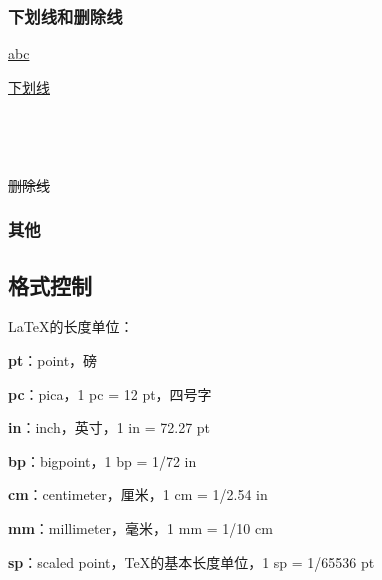 \documentclass{ctexart}
\begin{document}
	    \subsubsection{下划线和删除线}
            \underline{abc} 
		
            \uline{下划线}\\
            \\
            \\
            \\
            \\
            \sout{删除线}\\

        \subsubsection{其他}
    
    \subsection{格式控制}
            \LaTeX 的长度单位：

            \textbf{pt}：point，磅

            \textbf{pc}：pica，1 pc = 12 pt，四号字

            \textbf{in}：inch，英寸，1 in = 72.27 pt

            \textbf{bp}：bigpoint，1 bp = 1/72 in

            \textbf{cm}：centimeter，厘米，1 cm = 1/2.54 in

            \textbf{mm}：millimeter，毫米，1 mm = 1/10 cm

            \textbf{sp}：scaled point，\TeX 的基本长度单位，1 sp = 1/65536 pt
\end{document}
